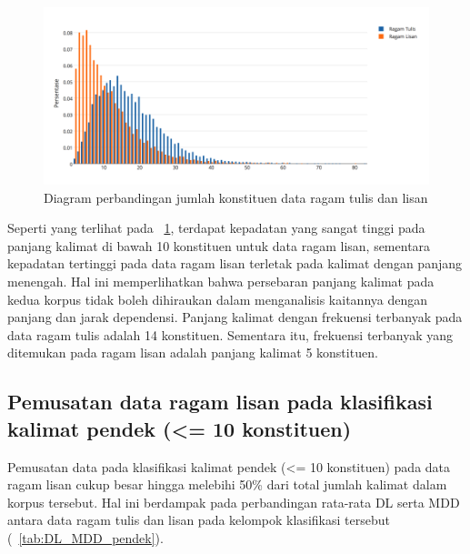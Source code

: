 \begin{figure}
	\centering \includegraphics[width=1
	\textwidth] {pics/Jumlah_kata.png} 
	\caption{Diagram perbandingan jumlah konstituen data ragam tulis dan lisan} 
	\label{fig:jumlah_kata} 
\end{figure}

Seperti yang terlihat pada \pic~\ref{fig:jumlah_kata}, terdapat kepadatan yang sangat tinggi pada panjang kalimat di bawah 10 konstituen untuk data ragam lisan, sementara kepadatan tertinggi pada data ragam lisan terletak pada kalimat dengan panjang menengah. Hal ini memperlihatkan bahwa persebaran panjang kalimat pada kedua korpus tidak boleh dihiraukan dalam menganalisis kaitannya dengan panjang dan jarak dependensi. Panjang kalimat dengan frekuensi terbanyak pada data ragam tulis adalah 14 konstituen. Sementara itu, frekuensi terbanyak yang ditemukan pada ragam lisan adalah panjang kalimat 5 konstituen.

\subsection{Pemusatan data ragam lisan pada klasifikasi kalimat pendek (\textless= 10 konstituen)}
Pemusatan data pada klasifikasi kalimat pendek (\textless= 10 konstituen) pada data ragam lisan cukup besar hingga melebihi 50\% dari total jumlah kalimat dalam korpus tersebut. Hal ini berdampak pada perbandingan rata-rata DL serta MDD antara data ragam tulis dan lisan pada kelompok klasifikasi tersebut (\tab~\ref{tab:DL_MDD_pendek}).

